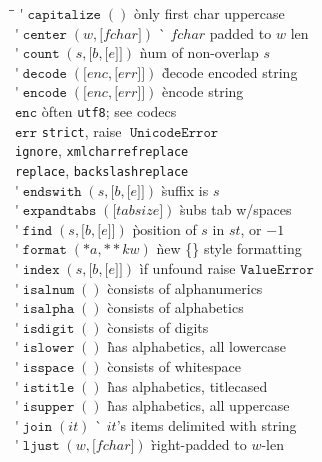 \documentclass[landscape,10pt,letterpaper]{article}
\newcounter{pyversion}
\newcommand{\pyf}[1]{\ensuremath{\mathop{\mathtt{#1}}}}
\newcommand{\pyv}[2]{\ifthenelse{\value{pyversion}<#1}{}{#2}}
\newcommand{\pys}[1]{\ensuremath{\mathtt{#1}}}
\newcommand{\pyt}[1]{\pyf{#1}}
\newcommand{\optional}[1]{{[}{#1}{]}}
\begin{document}
\begin{multicols}{6}
\begin{tabbing}
\hspace{2em}\=\hspace{1em}\= \kill
\'$\pyf{capitalize}()$ \` only first char uppercase \\
\'$\pyf{center}(w, \optional{fchar})$ \` $f\!char$ padded to $w$ len \\
\'$\pyf{count}(s, \optional{b, \optional{e}})$ \` num of non-overlap $s$ \\
\'$\pyf{decode}(\optional{enc, \optional{err}})$ \` decode encoded string \\
\'$\pyf{encode}(\optional{enc, \optional{err}})$ \` encode string \\
\> \pys{enc} \` often \verb.utf8.; see codecs \\
\> \pys{err} \` \verb.strict., raise \pyt{UnicodeError} \\
\` \verb.ignore., \verb.xmlcharrefreplace. \\
\` \verb.replace., \verb.backslashreplace. \\
\'$\pyf{endswith}(s, \optional{b, \optional{e}})$ \` suffix is $s$ \\ %
\'$\pyf{expandtabs}(\optional{tabsize})$ \` subs tab w/spaces \\
\'$\pyf{find}(s, \optional{b, \optional{e}})$ \` position of $s$ in $st$, or $-1$ \\
\'$\pyf{format}(*a, *\!*\!kw)$ \` new \{\} style formatting \\
\'$\pyf{index}(\!s,\!\optional{b,\!\optional{e}}\!)$ \` if unfound raise \pys{ValueError} \\
\'$\pyf{isalnum}()$ \` consists of alphanumerics \\
\'$\pyf{isalpha}()$ \` consists of alphabetics \\
\'$\pyf{isdigit}()$ \` consists of digits \\
\'$\pyf{islower}()$ \` has alphabetics, all lowercase \\
\'$\pyf{isspace}()$ \` consists of whitespace \\
\'$\pyf{istitle}()$ \` has alphabetics, titlecased \\
\'$\pyf{isupper}()$ \` has alphabetics, all uppercase \\
\'$\pyf{join}(it)$ \` $it$'s items delimited with string \\
\'$\pyf{ljust}(w, \optional{f\!char})$ \` right-padded to $w$-len \\

\end{tabbing}
\end{multicols}
\end{document}
